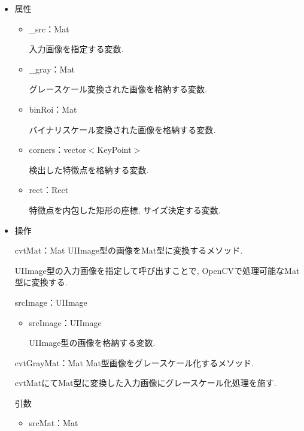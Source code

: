 \begin{description}
\begin{itemize}
\item 属性

\begin{breakbox}
\begin{itemize}
\item \_src：Mat

入力画像を指定する変数.

\item \_gray：Mat

グレースケール変換された画像を格納する変数.

\item binRoi：Mat

バイナリスケール変換された画像を格納する変数.

\item corners：vector$<$KeyPoint$>$

検出した特徴点を格納する変数.

\item rect：Rect

特徴点を内包した矩形の座標, サイズ決定する変数.

\end{itemize}
\end{breakbox}

\newpage

\item 操作

\begin{itembox}[l]{cvtMat：Mat}
UIImage型の画像をMat型に変換するメソッド.

UIImage型の入力画像を指定して呼び出すことで, OpenCVで処理可能なMat型に変換する.

\begin{itembox}[l]{srcImage：UIImage}
\begin{itemize}
\item srcImage：UIImage

UIImage型の画像を格納する変数.
\end{itemize}
\end{itembox}
\end{itembox}

\begin{itembox}[l]{cvtGrayMat：Mat}
Mat型画像をグレースケール化するメソッド.

cvtMatにてMat型に変換した入力画像にグレースケール化処理を施す.

\begin{itembox}[l]{引数}
\begin{itemize}
\item srcMat：Mat


\end{itemize}
\end{itembox}
\end{itembox}
\end{itemize}
\end{description}
